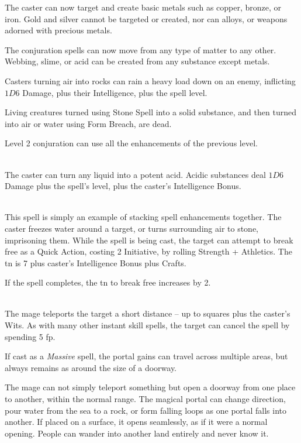 \begin{multicols}{2}
The caster can now target and create basic metals such as copper, bronze, or iron.  Gold and silver cannot be targeted or created, nor can alloys, or weapons adorned with precious metals.

The conjuration spells can now move from any type of matter to any other.  Webbing, slime, or acid can be created from any substance except metals.

Casters turning air into rocks can rain a heavy load down on an enemy, inflicting $1D6$ Damage, plus their Intelligence, plus the spell level.

Living creatures turned using Stone Spell into a solid substance, and then turned into air or water using Form Breach, are dead.

\spelllevel

Level 2 conjuration can use all the enhancements of the previous level.

\\
The caster can turn any liquid into a potent acid.  Acidic substances deal $1D6$ Damage plus the spell's level, plus the caster's Intelligence Bonus.

\\
This spell is simply an example of stacking spell enhancements together.  The caster freezes water around a target, or turns surrounding air to stone, imprisoning them.
While the spell is being cast, the target can attempt to break free as a Quick Action, costing 2 Initiative, by rolling Strength + Athletics.
The \gls{tn} is 7 plus caster's Intelligence Bonus plus Crafts.

If the spell completes, the \gls{tn} to break free increases by 2.

\spelllevel

\\
The mage teleports the target a short distance -- up to  squares plus the caster's Wits.  As with many other instant skill spells, the target can cancel the spell by spending 5 \gls{fp}.

If cast as a \textit{Massive} spell, the portal gains can travel across multiple areas, but always remains as around the size of a doorway.

The mage can not simply teleport something but open a doorway from one place to another, within the normal range.
The magical portal can change direction, pour water from the sea to a rock, or form falling loops as one portal falls into another.
If placed on a surface, it opens seamlessly, as if it were a normal opening.
People can wander into another land entirely and never know it.


\end{multicols}
